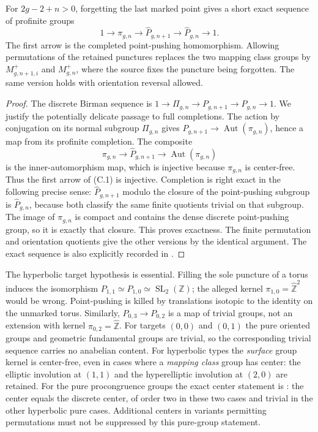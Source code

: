 For $2g-2+n>0$, forgetting the last marked point gives a short exact
sequence of profinite groups
\[
 1\longrightarrow\pi_{g,n}
 \longrightarrow\widehat P_{g,n+1}
 \longrightarrow\widehat P_{g,n}\longrightarrow1.
 \tag{C.1}
\]
The first arrow is the completed point-pushing homomorphism.
Allowing permutations of the retained punctures replaces the two
mapping class groups by $M^+_{g,n+1,i}$ and $M^+_{g,n}$, where the
source fixes the puncture being forgotten.  The same version holds
with orientation reversal allowed.

\begin{proof}
The discrete Birman sequence is
$1\to\Pi_{g,n}\to P_{g,n+1}\to P_{g,n}\to1$.
We justify the potentially delicate passage to full completions.
The action by conjugation on its normal subgroup $\Pi_{g,n}$
gives $P_{g,n+1}\to\operatorname{Aut}(\pi_{g,n})$, hence a map
from its profinite completion.  The composite
\[
 \pi_{g,n}\longrightarrow\widehat P_{g,n+1}
 \longrightarrow\operatorname{Aut}(\pi_{g,n})
\]
is the inner-automorphism map, which is injective because
$\pi_{g,n}$ is center-free.  Thus the first arrow of (C.1) is
injective.  Completion is right exact in the following precise
sense: $\widehat P_{g,n+1}$ modulo the closure of the point-pushing
subgroup is $\widehat P_{g,n}$, because both classify the same
finite quotients trivial on that subgroup.  The image of
$\pi_{g,n}$ is compact and contains the dense discrete
point-pushing group, so it is exactly that closure.  This proves
exactness.  The finite permutation and orientation quotients give
the other versions by the identical argument.  The exact sequence
is also explicitly recorded in
\citet[\S2, p.~4]{Boggi2009BC}.
\end{proof}

The hyperbolic target hypothesis is essential.  Filling the sole
puncture of a torus induces the isomorphism
$P_{1,1}\simeq P_{1,0}\simeq\operatorname{SL}_2(\mathbb Z)$;
the alleged kernel $\pi_{1,0}=\widehat{\mathbb Z}^2$ would be
wrong.  Point-pushing is killed by translations isotopic to the
identity on the unmarked torus.  Similarly,
$P_{0,3}\to P_{0,2}$ is a map of trivial groups, not an extension
with kernel $\pi_{0,2}=\widehat{\mathbb Z}$.  For targets $(0,0)$
and $(0,1)$ the pure oriented groups and geometric fundamental
groups are trivial, so the corresponding trivial sequence carries
no anabelian content.  For hyperbolic types the \emph{surface}
group kernel is center-free, even in cases where a \emph{mapping
class} group has center: the elliptic involution at $(1,1)$ and the
hyperelliptic involution at $(2,0)$ are retained.  For the pure
procongruence groups the exact center statement is
\citet[Theorem 4.4]{Boggi2020BC}: the center equals the discrete
center, of order two in these two cases and trivial in the other
hyperbolic pure cases.  Additional centers in variants permitting
permutations must not be suppressed by this pure-group statement.

